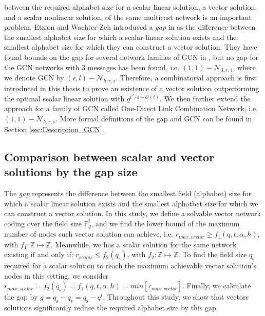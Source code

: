 between the required alphabet size for a scalar linear solution, a
vector solution, and a scalar nonlinear solution, of the same multicast
network is an important problem. Etzion and Wachter-Zeh introduced
a \textit{gap} in \cite{Etzion:2016} as the difference between the
smallest alphabet size for which a scalar linear solution exists and
the smallest alphabet size for which they can construct a vector solution.
They have found bounds on the gap for several network families of
GCN in \cite{Etzion:2016,Wachter-Zeh:2018}, but no gap for the GCN
networks with 3 messages has been found, i.e. $(1,1)-\mathcal{N}_{3,r,4}$,
where we denote GCN by $(\epsilon,l)-\mathcal{N}_{h,r,s}$. Therefore,
a combinatorial approach is first introduced in this thesis to prove
an existence of a vector solution outperforming the optimal scalar
linear solution with $q^{t^{2}/4+\mathcal{O}(t)}$. We then further
extend the approach for a family of GCN called One-Direct Link Combination
Network, i.e. $(1,1)-\mathcal{N}_{h,r,s}$. More formal definitions
of the gap and GCN can be found in Section \ref{sec:Description_GCN}.

\subsection{Comparison between scalar and vector solutions by the gap size \label{subsec:Comparison-between-scalar-and-vector-sol}}

The \textit{gap} represents the difference between the smallest field
(alphabet) size for which a scalar linear solution exists and the
smallest alphatbet size for which we can construct a vector solution.
In this study, we define a solvable vector network coding over the
field size $\ensuremath{\mathbb{F}}_{q}^{t}$, and we find the lower
bound of the maximum number of nodes such vector solution can achieve,
i.e. $r_{max,vector}\geq f_{1}(q,t,\alpha,h)$, with $f_{1}:\mathbb{Z}\mapsto\mathbb{Z}$.
Meanwhile, we has a scalar solution for the same network existing
if and only if: $r_{scalar}\leq f_{2}\left(q_{\mathrm{s}}\right)$,
with $f_{2}:\mathbb{Z}\mapsto\mathbb{Z}$. To find the field size
$q_{\mathrm{s}}$ required for a scalar solution to reach the maximum
achievable vector solution's nodes in this setting, we consider $r_{max,scalar}=f_{2}\left(q_{\mathrm{s}}\right)=f_{1}(q,t,\alpha,h)=min\left[r_{max,vector}\right]$.
Finally, we calculate the gap by $g=q_{\mathrm{s}}-q_{v}=q_{\mathrm{s}}-q^{t}.$
Throughout this study, we show that vectors solutions significantly
reduce the required alphabet size by this gap.

\clearpage